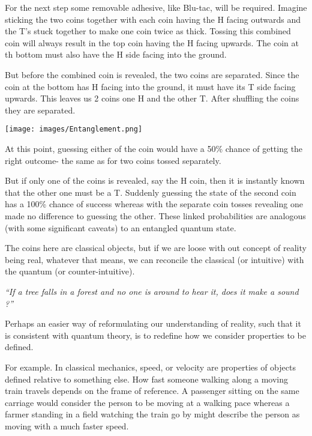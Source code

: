 \documentclass{book}
\begin{document}
For the next step some removable adhesive, like Blu-tac, will be required. Imagine sticking the two coins together with each coin having the H facing outwards and the T's stuck together to make one coin twice as thick. Tossing this combined coin will always result in the top coin having the H facing upwards. The coin at th bottom must also have the H side facing into the ground. 

But before the combined coin is revealed, the two coins are separated. Since the coin at the bottom has H facing into the ground, it must have its T side facing upwards. This leaves us 2 coins one H and the other T. After shuffling the coins they are separated. 

\texttt{[image: images/Entanglement.png]}

At this point, guessing either of the coin would have a 50\% chance of getting the right outcome- the same as for two coins tossed separately. 

But if only one of the coins is revealed, say the H coin, then it is instantly known that the other one must be a T. Suddenly guessing the state of the second coin has a 100\% chance of success whereas with the separate coin tosses revealing one made no difference to guessing the other. These linked probabilities are analogous (with some significant caveats) to an entangled quantum state.

The coins here are classical objects, but if we are loose with out concept of reality being real, whatever that means, we can reconcile the classical (or intuitive) with the quantum (or counter-intuitive). 

\textit{``If a tree falls in a forest and no one is around to hear it, does it make a sound ?''}

Perhaps an easier way of reformulating our understanding of reality, such that it is consistent with quantum theory, is to redefine how we consider properties to be defined. \newline

For example. In classical mechanics, speed, or velocity are properties of objects defined relative to something else. How fast someone walking along a moving train travels depends on the frame of reference. A passenger sitting on the same carriage would consider the person to be moving at a walking pace whereas a farmer standing in a field watching the train go by might describe the person as moving with a much faster speed. \newline
\end{document}
